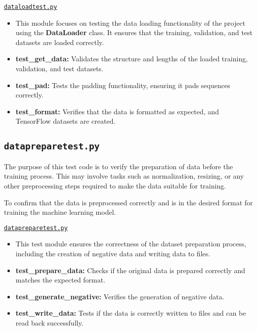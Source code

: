 			\href{../Documents/MagicWand/ML23-06-Magic-Wand-with-an-Arduino-Nano-33-BLE-sense/Sourcecode/Code/Datatraining/Tests/dataloadtest.py}{\texttt{dataloadtest.py}}
			
			\begin{itemize}
				
				\item This module focuses on testing the data loading functionality of the project using the \textbf{DataLoader} class. It ensures that the training, validation, and test datasets are loaded correctly.
				
				\item \textbf{test\_get\_data:} Validates the structure and lengths of the loaded training, validation, and test datasets.
				
				\item \textbf{test\_pad:} Tests the padding functionality, ensuring it pads sequences correctly.
				
				\item \textbf{test\_format:} Verifies that the data is formatted as expected, and TensorFlow datasets are created.
				
			\end{itemize}
		
			\subsection{\texttt{datapreparetest.py}}
			
			The purpose of this test code is to verify the preparation of data before the training process. This may involve tasks such as normalization, resizing, or any other preprocessing steps required to make the data suitable for training.
			
			To confirm that the data is preprocessed correctly and is in the desired format for training the machine learning model.
			
			\href{../Documents/MagicWand/ML23-06-Magic-Wand-with-an-Arduino-Nano-33-BLE-sense/Sourcecode/Code/Datatraining/Tests/datapreparetest.py}{\texttt{datapreparetest.py}}
			
			\begin{itemize}
				
				\item This test module ensures the correctness of the dataset preparation process, including the creation of negative data and writing data to files.
				
				\item \textbf{test\_prepare\_data:} Checks if the original data is prepared correctly and matches the expected format.
				
				\item \textbf{test\_generate\_negative:} Verifies the generation of negative data.
				
				\item \textbf{test\_write\_data:} Tests if the data is correctly written to files and can be read back successfully.
				
			\end{itemize}
			
